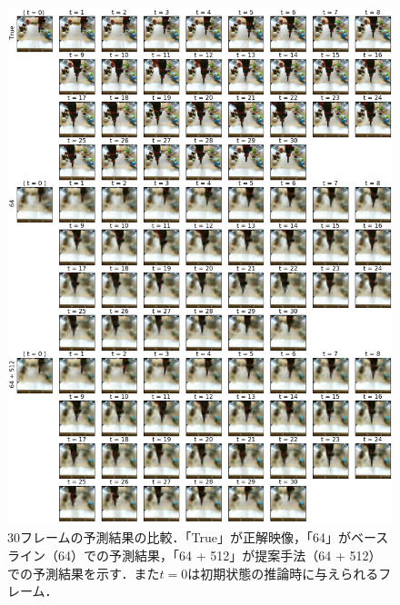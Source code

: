 \documentclass[10pt, twocolumn]{jarticle}
\begin{document}
\begin{figure}[tbp]
    \begin{center}
        \includegraphics[width=\linewidth]{./figures/pred_long.png}
        \caption[30フレームの予測結果の比較]{30フレームの予測結果の比較．「True」が正解映像，「64」がベースライン（64）での予測結果，「64 + 512」が提案手法（64 + 512）での予測結果を示す．また$t = 0$は初期状態の推論時に与えられるフレーム．}
        \label{fig:pred_long}
    \end{center}
\end{figure}



\end{document}
